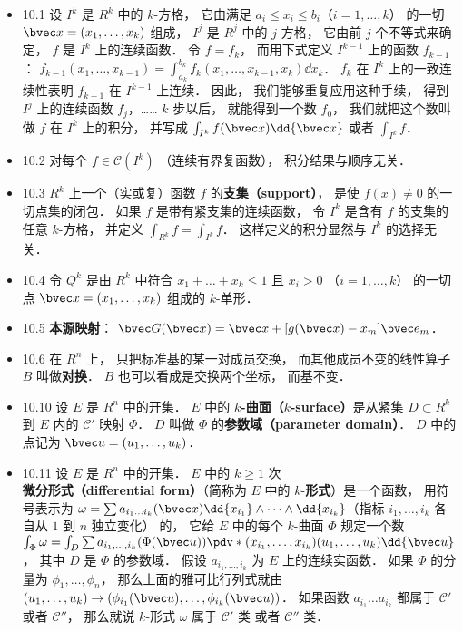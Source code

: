 \begin{itemize}
\item 10.1 设 $I^k$ 是 $R^k$ 中的 $k$-方格， 它由满足 $a_i\leqslant x_i \leqslant b_i$（$i=1,\dots,k$） 的一切 $\bvec x=(x_1,\dots,x_k)$ 组成， $I^j$ 是 $R^j$ 中的 $j$-方格， 它由前 $j$ 个不等式来确定， $f$ 是 $I^k$ 上的连续函数． 令 $f = f_k$， 而用下式定义 $I^{k-1}$ 上的函数 $f_{k-1}$： $f_{k-1}(x_1,\dots,x_{k-1}) = \int_{a_k}^{b_k} f_k(x_1,\dots,x_{k-1},x_k)\dd{x_k}$． $f_k$ 在 $I^k$ 上的一致连续性表明 $f_{k-1}$ 在 $I^{k-1}$ 上连续． 因此， 我们能够重复应用这种手续， 得到 $I^j$ 上的连续函数 $f_j$，…… $k$ 步以后， 就能得到一个数 $f_0$， 我们就把这个数叫做 $f$ 在 $I^k$ 上的积分， 并写成 $\int_{I^k} f(\bvec x)\dd{\bvec x}$ 或者 $\int_{I^k} f$．

\item 10.2 对每个 $f\in \mathscr C(I^k)$ （连续有界复函数）， 积分结果与顺序无关．

\item 10.3 $R^k$ 上一个（实或复）函数 $f$ 的\textbf{支集（support）}， 是使 $f(x)\ne 0$ 的一切点集的闭包． 如果 $f$ 是带有紧支集的连续函数， 令 $I^k$ 是含有 $f$ 的支集的任意 $k$-方格， 并定义 $\int_{R^k}f = \int_{I^k}f$． 这样定义的积分显然与 $I^k$ 的选择无关．

\item 10.4 令 $Q^k$ 是由 $R^k$ 中符合 $x_1+\dots+x_k\leqslant 1$ 且 $x_i >0$ （$i=1,\dots,k$） 的一切点 $\bvec x=(x_1,\dots,x_k)$ 组成的 $k$-单形． 

\item 10.5 \textbf{本源映射}： $\bvec G(\bvec x) = \bvec x + [g(\bvec x)-x_m]\bvec e_m$．

\item 10.6 在 $R^n$ 上， 只把标准基的某一对成员交换， 而其他成员不变的线性算子 $B$ 叫做\textbf{对换}． $B$ 也可以看成是交换两个坐标， 而基不变．

\item 10.10 设 $E$ 是 $R^n$ 中的开集． $E$ 中的 \textbf{$k$-曲面（$k$-surface）}是从紧集 $D\subset R^k$ 到 $E$ 内的 $\mathscr C'$ 映射 $\Phi$． $D$ 叫做 $\Phi$ 的\textbf{参数域（parameter domain）}． $D$ 中的点记为 $\bvec u = (u_1,\dots, u_k)$．

\item 10.11 设 $E$ 是 $R^n$ 中的开集． $E$ 中的 $k\geqslant 1$ 次\textbf{微分形式（differential form）}（简称为 $E$ 中的 $k$-\textbf{形式}）是一个函数， 用符号表示为 $\omega = \sum a_{i_1\dots i_k}(\bvec x)\dd{x_{i_1}} \wedge \dots \wedge \dd{x_{i_k}}$（指标 $i_1,\dots,i_k$ 各自从 $1$ 到 $n$ 独立变化） 的， 它给 $E$ 中的每个 $k$-曲面 $\Phi$ 规定一个数 $\int_\Phi \omega = \int_D \sum a_{i_1,\dots,i_k}(\Phi(\bvec u)) \pdv*{(x_{i_1},\dots,x_{i_k})}{(u_1,\dots,u_k)}\dd{\bvec u}$， 其中 $D$ 是 $\Phi$ 的参数域． 假设 $a_{i_1,\dots,i_k}$ 为 $E$ 上的连续实函数． 如果 $\Phi$ 的分量为 $\phi_1, \dots, \phi_n$， 那么上面的雅可比行列式就由 $(u_1,\dots,u_k)\to (\phi_{i_1}(\bvec u),\dots,\phi_{i_k}(\bvec u))$． 如果函数 $a_{i_1}\dots a_{i_k}$ 都属于 $\mathscr C'$ 或者 $\mathscr C''$， 那么就说 $k$-形式 $\omega$ 属于 $\mathscr C'$ 类 或者 $\mathscr C''$ 类．


\end{itemize}
